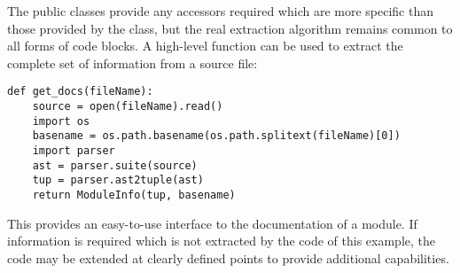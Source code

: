 The public classes provide any accessors required which are more
specific than those provided by the  class, but
the real extraction algorithm remains common to all forms of code
blocks.  A high-level function can be used to extract the complete set
of information from a source file:

\begin{verbatim}
def get_docs(fileName):
    source = open(fileName).read()
    import os
    basename = os.path.basename(os.path.splitext(fileName)[0])
    import parser
    ast = parser.suite(source)
    tup = parser.ast2tuple(ast)
    return ModuleInfo(tup, basename)
\end{verbatim}

This provides an easy-to-use interface to the documentation of a
module.  If information is required which is not extracted by the code
of this example, the code may be extended at clearly defined points to
provide additional capabilities.


